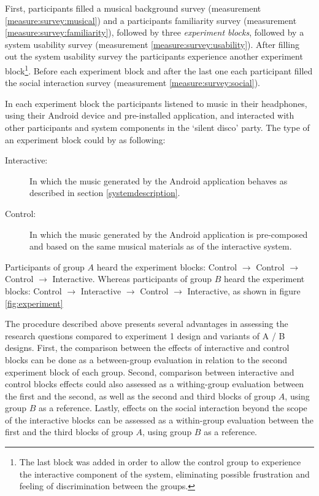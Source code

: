 \documentclass[a4paper,11pt]{article}
\newcommand{\definition}[1]{\emph{#1}}
\begin{document}
{First, participants filled a musical background survey (measurement \ref{measure:survey:musical}) and a participants familiarity survey (measurement \ref{measure:survey:familiarity}), followed by three \definition{experiment blocks}, followed by a system usability survey (measurement \ref{measure:survey:usability}).
After filling out the system usability survey the participants experience another experiment block\footnote{The last block was added in order to allow the control group to experience the interactive component of the system, eliminating possible frustration and feeling of discrimination between the groups.}.
Before each experiment block and after the last one each participant filled the social interaction survey (measurement \ref{measure:survey:social}).

In each experiment block the participants listened to music in their headphones, using their Android device and pre-installed application, and interacted with other participants and system components in the `silent disco' party.
The type of an experiment block could by as following:

\begin{description}
	\item[Interactive:] In which the music generated by the Android application behaves as described in section \ref{systemdescription}.
	\item[Control:] In which the music generated by the Android application is pre-composed and based on the same musical materials as of the interactive system.
\end{description}

Participants of group $A$ heard the experiment blocks: Control $\rightarrow$ Control $\rightarrow$ Control $\rightarrow$ Interactive.
Whereas participants of group $B$ heard the experiment blocks: Control $\rightarrow$ Interactive $\rightarrow$ Control $\rightarrow$ Interactive, as shown in figure \ref{fig:experiment}

The procedure described above presents several advantages in assessing the research questions compared to experiment 1 design and variants of A / B designs.
First, the comparison between the effects of interactive and control blocks can be done as a between-group evaluation in relation to the second experiment block of each group.
Second, comparison between interactive and control blocks effects could also assessed as a withing-group evaluation between the first and the second, as well as the second and third blocks of group $A$, using group $B$ as a reference.
Lastly, effects on the social interaction beyond the scope of the interactive blocks can be assessed as a within-group evaluation between the first and the third blocks of group $A$, using group $B$ as a reference.

}
\end{document}
